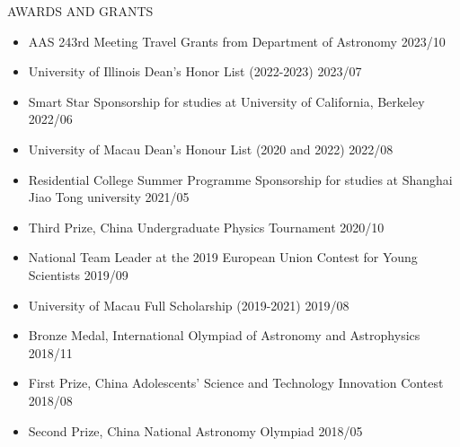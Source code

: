 \documentclass[10pt]{article} %
\begin{document}
\begin{section}{AWARDS AND GRANTS}

    \begin{itemize}[leftmargin=1.5em]
        \item AAS 243rd Meeting Travel Grants from Department of Astronomy \hfill 2023/10
        \item University of Illinois Dean's Honor List (2022-2023) \hfill 2023/07
        \item Smart Star Sponsorship for studies at University of California, Berkeley \hfill 2022/06
        \item University of Macau Dean's Honour List (2020 and 2022) \hfill 2022/08
        \item Residential College Summer Programme Sponsorship for studies at Shanghai Jiao Tong university \hfill 2021/05
        \item Third Prize, China Undergraduate Physics Tournament \hfill 2020/10
        \item National Team Leader at the 2019 European Union Contest for Young Scientists \hfill 2019/09
        \item University of Macau Full Scholarship (2019-2021) \hfill 2019/08
        \item Bronze Medal, International Olympiad of Astronomy and Astrophysics \hfill 2018/11
        \item First Prize, China Adolescents' Science and Technology Innovation Contest \hfill 2018/08
        \item Second Prize, China National Astronomy Olympiad \hfill 2018/05
    \end{itemize}
        
\end{section}
\end{document}
